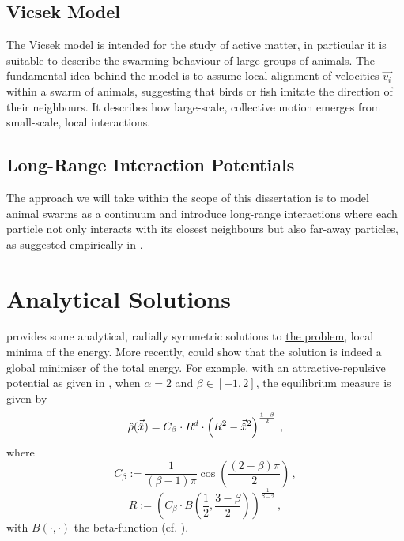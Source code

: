 \subsection{Vicsek Model}
The Vicsek model \parencite{1995-vicsek-model} is intended for the study of active matter, in particular it is suitable to describe the swarming behaviour of large groups of animals.
The fundamental idea behind the model is to assume local alignment of velocities $\vec{v_i}$ within a swarm of animals, suggesting that birds or fish imitate the direction of their neighbours.
It describes how large-scale, collective motion emerges from small-scale, local interactions.

\subsection{Long-Range Interaction Potentials}
The approach we will take within the scope of this dissertation is to model animal swarms as a continuum and introduce long-range interactions where each particle not only interacts with its closest neighbours but also far-away particles, as suggested empirically in \cite{2010-starlings}.

\section{Analytical Solutions}
\label{sec:analytical-solutions}
\cite{2017-explicit-solutions} provides some analytical, radially symmetric solutions to \hyperref[def:the-problem]{the problem}, local minima of the energy.
More recently, \cite{2021-carrillo-radial} could show that the solution is indeed a global minimiser of the total energy.
For example, with an attractive-repulsive potential as given in , when $\alpha = 2$ and $\beta \in [-1, 2]$, the equilibrium measure is given by
\begin{equation}
  \hat{\rho}(\vec{\hat{x}}) = C_\beta \cdot R^d \cdot \left(R^2 - \vec{\hat{x}}^2\right)^{\frac{1-\beta}{2}}\,,
  \label{eq:analytical-solution-alpha-equal-2}
\end{equation}
where
$$C_\beta := \frac{1}{(\beta - 1) \pi} \cos\left(\frac{(2 - \beta) \pi}{2}\right)\,,$$
$$R := \left(C_\beta \cdot B\left(\frac{1}{2}, \frac{3 - \beta}{2}\right)\right)^{\frac{1}{\beta - 2}}\,,$$
with $B(\cdot, \cdot)$ the beta-function (cf. ).
